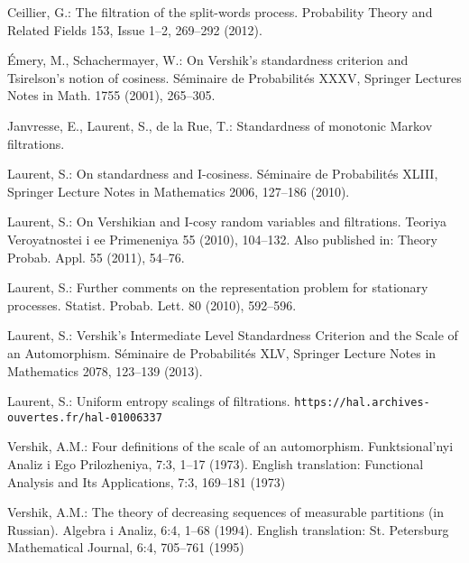 \documentclass[12pt,a4paper]{article}
\begin{document}





\begin{thebibliography}{99.}

Ceillier, G.:
The filtration of the split-words process. 
Probability Theory and Related Fields 153, Issue 1--2, 
 269--292 (2012).

 \'{E}mery, M.,  Schachermayer, W.: 
On Vershik's standardness criterion and Tsirelson's  notion of cosiness. 
 S\'eminaire de Probabilit\'es XXXV,  
Springer Lectures Notes in Math. 1755 (2001), 
265--305.

Janvresse, E., Laurent, S., de la Rue, T.:
Standardness of monotonic Markov filtrations. 


 Laurent, S.: 
On standardness and I-cosiness. S\'eminaire de Probabilit\'es XLIII, 
Springer Lecture Notes in Mathematics 2006, 
127--186 (2010).

 Laurent, S.: 
On Vershikian and I-cosy random variables and filtrations.
Teoriya Veroyatnostei i ee Primeneniya 55 (2010), 104--132. 
Also published in: Theory Probab. Appl. 55 (2011), 54--76.

Laurent, S.: 
Further comments on the representation problem for stationary processes. 
Statist. Probab. Lett. 80 (2010),  592--596. 

Laurent, S.: 
Vershik's Intermediate Level Standardness Criterion and the Scale of an Automorphism. 
S\'eminaire de Probabilit\'es XLV,
Springer Lecture Notes in Mathematics 2078,
123--139 (2013).

Laurent, S.: 
Uniform entropy scalings of filtrations. 
\verb+https://hal.archives-ouvertes.fr/hal-01006337+ 

Vershik, A.M.: 
Four definitions of the scale of an automorphism. 
Funktsional'nyi Analiz i Ego Prilozheniya, 7:3, 
1--17 (1973). 
English translation:    
Functional Analysis and Its Applications, 7:3, 169--181 (1973)

Vershik, A.M.: 
The theory of decreasing sequences of measurable partitions (in Russian). 
 Algebra i Analiz,  6:4, 1--68 (1994). 
English translation:  St. Petersburg Mathematical Journal, 6:4, 705--761 (1995)


\end{thebibliography}
\end{document}
